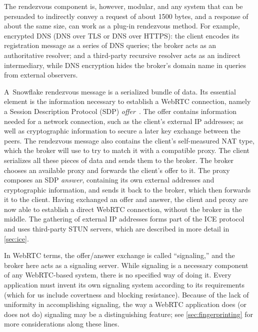 \documentclass[letterpaper,twocolumn]{article}
\newcommand{\firstterm}[1]{\textit{#1}}
\begin{document}
The rendezvous component is, however, modular,
and any system that can be persuaded to indirectly convey a request
of about 1500 bytes, and a response of about the same size,
can work as a plug-in rendezvous method.
For example, encrypted DNS
(DNS over TLS or DNS over HTTPS):
the client encodes its registration message as a series of DNS queries;
the broker acts as an authoritative resolver;
and a third-party recursive resolver acts as an indirect intermediary,
while DNS encryption hides the broker's domain name in queries
from external observers.

A~Snowflake rendezvous message is a serialized bundle of data.
Its essential element
is the information necessary to establish a WebRTC connection,
namely a Session Description Protocol (SDP) \firstterm{offer}~\cite{rfc8839}.
The offer contains information needed for a network connection,
such as the client's external IP addresses;
as well as cryptographic information to secure a later key exchange between the peers.
The rendezvous message also contains the client's
self-measured NAT type, which the broker will use to try to match it
with a compatible proxy.
The client serializes all these pieces of data and sends them to the broker.
The broker chooses an available proxy
and forwards the client's offer to it.
The proxy composes an SDP \firstterm{answer},
containing its own external addresses and cryptographic information,
and sends it back to the broker,
which then forwards it to the client.
Having exchanged an offer and answer,
the client and proxy are now able to establish a direct WebRTC connection,
without the broker in the middle.
The gathering of external IP addresses
forms part of the ICE protocol
and uses third-party STUN servers,
which are described in more detail in \autoref{sec:ice}.

In WebRTC terms, the offer/answer exchange is called
``signaling,'' and the broker here acts as a signaling server.
While signaling is a necessary component
of any WebRTC-based system,
there is no specified way of doing it.
Every application must invent its own signaling system
according to its requirements
(which for us include covertness and blocking resistance).
Because of the lack of uniformity in accomplishing signaling,
the way a WebRTC application does (or does not do) signaling
may be a distinguishing feature; see \autoref{sec:fingerprinting}
for more considerations along these lines.
\end{document}
